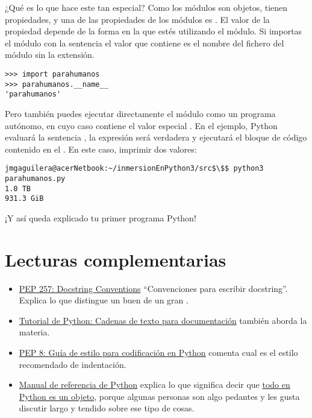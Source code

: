 ¿Qué es lo que hace este  tan especial? Como los módulos son objetos, tienen propiedades, y una de las propiedades de los módulos es . El valor de la propiedad  depende de la forma en la que estés utilizando el módulo. Si importas el módulo con la sentencia  el valor que contiene  es el nombre del fichero del módulo sin la extensión.

\noindent\begin{minipage}{\textwidth}
\begin{lstlisting}[mathescape=True]
>>> import parahumanos
>>> parahumanos.__name__
'parahumanos'
\end{lstlisting}
\end{minipage}

Pero también puedes ejecutar directamente el módulo como un programa autónomo, en cuyo caso  contiene el valor especial . En el ejemplo, Python evaluará la sentencia , la expresión será verdadera y ejecutará el bloque de código contenido en el . En este caso, imprimir dos valores:

\noindent\begin{minipage}{\textwidth}
\begin{lstlisting}[mathescape=True]
jmgaguilera@acerNetbook:~/inmersionEnPython3/src$\$$ python3 parahumanos.py
1.0 TB
931.3 GiB
\end{lstlisting}
\end{minipage}

¡Y así queda explicado tu primer programa Python!

\section{Lecturas complementarias}

\begin{itemize}

\item \href{http://www.python.org/dev/peps/pep-0257/}{PEP 257: Docstring Conventions} ``Convenciones para escribir docstring''. Explica lo que distingue un buen  de un gran .

\item \href{http://docs.python.org/3.1/tutorial/controlflow.html#documentation-strings}{Tutorial de Python: Cadenas de texto para documentación} también aborda la materia.

\item \href{http://www.python.org/dev/peps/pep-0008/}{PEP 8: Guía de estilo para codificación en Python} comenta cual es el estilo recomendado de indentación.

\item \href{http://docs.python.org/3.1/reference/}{Manual de referencia de Python} explica lo que significa decir que \href{http://docs.python.org/3.1/reference/datamodel.html#objects-values-and-types}{todo en Python es un objeto}, porque algunas personas son algo pedantes y les gusta discutir largo y tendido sobre ese tipo de cosas.

\end{itemize}
